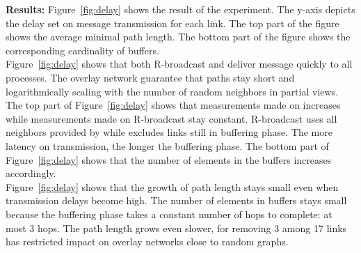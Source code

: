 \noindent \textbf{Results:} Figure~\ref{fig:delay} shows the result of the
experiment. The y-axis depicts the delay set on message transmission for each
link. The top part of the figure shows the average minimal path length. The
bottom part of the figure shows the corresponding cardinality of
buffers. \\
Figure~\ref{fig:delay} shows that both R-broadcast and \CBROADCAST deliver
message quickly to all processes. The overlay network guarantee that paths stay
short and logarithmically scaling with the number of random neighbors in partial
views. \\
The top part of Figure~\ref{fig:delay} shows that measurements made on
\CBROADCAST increases while measurements made on R-broadcast stay
constant. R-broadcast uses all neighbors provided by \SPRAY while \CBROADCAST
excludes links still in buffering phase. The more latency on transmission, the
longer the buffering phase. The bottom part of Figure~\ref{fig:delay} shows that
the number of elements in the buffers increases accordingly. \\
Figure~\ref{fig:delay} shows that the growth of path length stays small even
when transmission delays become high. The number of elements in buffers stays
small because the buffering phase takes a constant number of hops to complete:
at most 3 hops. The path length grows even slower, for removing 3 among 17 links
has restricted impact on overlay networks close to random graphs.

